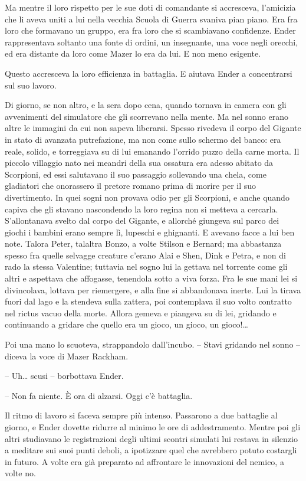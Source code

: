 {Ma mentre il loro rispetto per le sue doti di comandante si accresceva,
	l'amicizia che li aveva uniti a lui nella vecchia Scuola di Guerra
	svaniva pian piano. Era fra loro che formavano un gruppo, era fra loro
	che si scambiavano confidenze. Ender rappresentava soltanto una fonte di
	ordini, un insegnante, una voce negli orecchi, ed era distante da loro
	come Mazer lo era da lui. E non meno esigente.}

{Questo accresceva la loro efficienza in battaglia. E aiutava Ender a
	concentrarsi sul suo lavoro.}

{Di giorno, se non altro, e la sera dopo cena, quando tornava in camera
	con gli avvenimenti del simulatore che gli scorrevano nella mente. Ma
	nel sonno erano altre le immagini da cui non sapeva liberarsi. Spesso
	rivedeva il corpo del Gigante in stato di avanzata putrefazione, ma non
	come sullo schermo del banco: era reale, solido, e torreggiava su di lui
	emanando l'orrido puzzo della carne morta. Il piccolo villaggio nato nei
	meandri della sua ossatura era adesso abitato da Scorpioni, ed essi
	salutavano il suo passaggio sollevando una chela, come gladiatori che
	onorassero il pretore romano prima di morire per il suo divertimento. In
	quei sogni non provava odio per gli Scorpioni, e anche quando capiva che
	gli stavano nascondendo la loro regina non si metteva a cercarla.
	S'allontanava svelto dal corpo del Gigante, e allorché giungeva sul
	parco dei giochi i bambini erano sempre lì, lupeschi e ghignanti. E
	avevano facce a lui ben note. Talora Peter, talaltra Bonzo, a volte
	Stilson e Bernard; ma abbastanza spesso fra quelle selvagge creature
	c'erano Alai e Shen, Dink e Petra, e non di rado la stessa Valentine;
	tuttavia nel sogno lui la gettava nel torrente come gli altri e
	aspettava che affogasse, tenendola sotto a viva forza. Fra le sue mani
	lei si divincolava, lottava per riemergere, e alla fine si abbandonava
	inerte. Lui la tirava fuori dal lago e la stendeva sulla zattera, poi
	contemplava il suo volto contratto nel rictus vacuo della morte. Allora
	gemeva e piangeva su di lei, gridando e continuando a gridare che quello
	era un gioco, un gioco, un gioco!\ldots{}}

{Poi una mano lo scuoteva, strappandolo dall'incubo. -- Stavi gridando
	nel sonno -- diceva la voce di Mazer Rackham.}

{-- Uh\ldots{} scusi -- borbottava Ender.}

{-- Non fa niente. È ora di alzarsi. Oggi c'è battaglia.}

{Il ritmo di lavoro si faceva sempre più intenso. Passarono a due
	battaglie al giorno, e Ender dovette ridurre al minimo le ore di
	addestramento. Mentre poi gli altri studiavano le registrazioni degli
	ultimi scontri simulati lui restava in silenzio a meditare sui suoi
	punti deboli, a ipotizzare quel che avrebbero potuto costargli in
	futuro. A volte era già preparato ad affrontare le innovazioni del
	nemico, a volte no.}

